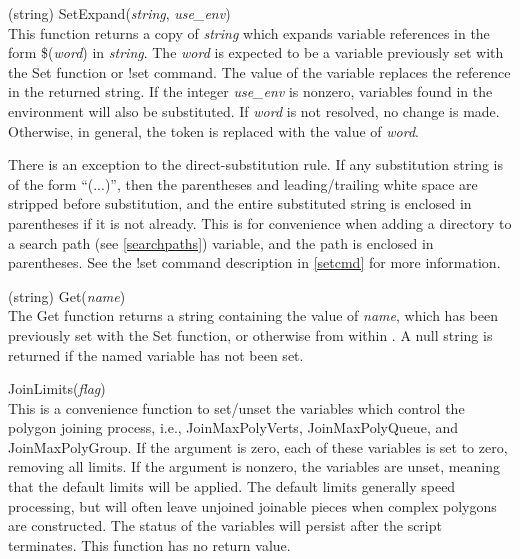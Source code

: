 \begin{description}
\item{(string) \vt SetExpand({\it string\/}, {\it use\_env\/})}\\
This function returns a copy of {\it string} which expands variable
references in the form \$({\it word}) in {\it string}.  The {\it word}
is expected to be a variable previously set with the {\vt Set}
function or {\cb !set} command.  The value of the variable replaces
the reference in the returned string.  If the integer {\it use\_env}
is nonzero, variables found in the environment will also be
substituted.  If {\it word} is not resolved, no change is made. 
Otherwise, in general, the token is replaced with the value of {\it
word}.

There is an exception to the direct-substitution rule.  If any
substitution string is of the form ``{\vt (...)}'', then the
parentheses and leading/trailing white space are stripped before
substitution, and the entire substituted string is enclosed in
parentheses if it is not already.  This is for convenience when adding
a directory to a search path (see \ref{searchpaths}) variable, and the
path is enclosed in parentheses.  See the {\cb !set} command
description in \ref{setcmd} for more information.

\item{(string) \vt Get({\it name})}\\
The {\vt Get} function returns a string containing the value of {\it
name\/}, which has been previously set with the {\vt Set} function, or
otherwise from within {\Xic}.  A null string is returned if
the named variable has not been set.

\item{\vt JoinLimits({\it flag})}\\
This is a convenience function to set/unset the variables which
control the polygon joining process, i.e., {\et JoinMaxPolyVerts},
{\et JoinMaxPolyQueue}, and {\et JoinMaxPolyGroup}.  If the argument
is zero, each of these variables is set to zero, removing all limits. 
If the argument is nonzero, the variables are unset, meaning that the
default limits will be applied.  The default limits generally speed
processing, but will often leave unjoined joinable pieces when complex
polygons are constructed.  The status of the variables will persist
after the script terminates.  This function has no return value.

\end{description}


